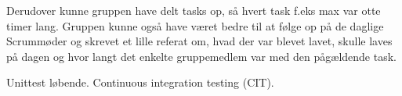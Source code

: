 Derudover kunne gruppen have delt tasks op, så hvert task f.eks max var otte timer lang. Gruppen kunne også have været bedre til at følge op på de daglige Scrummøder og skrevet et lille referat om, hvad der var blevet lavet, skulle laves på dagen og hvor langt det enkelte gruppemedlem var med den pågældende task.

Unittest løbende. Continuous integration testing (CIT). 